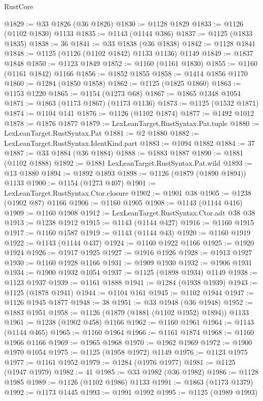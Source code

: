 \begin{lexlean}{RustCore}
\begin{coremodule}
@1829 := @33 @1826 (@36 @1826)
@1830 := @1128 @1829
@1833 := @1126 (@1102 @1830) @1133
@1835 := @1143 (@1144 @386)
@1837 := @1125 (@1833 @1835)
@1838 := 36
@1841 := @33 @1838 (@36 @1838)
@1842 := @1128 @1841
@1848 := @1125 (@1126 (@1102 @1842) @1133 @1136) @1149
@1849 := @1837 @1848
@1850 := @1123 @1849
@1852 := @1160 (@1161 @1830)
@1855 := @1160 (@1161 @1842) @1166
@1856 := @1852 @1855
@1858 := @1414 @1856 @1170
@1860 := @1284 (@1850 @1858)
@1862 := @1125 (@1825 @1860)
@1863 := @1153 @1220
@1865 := @1154 (@1273 @68)
@1867 := @1865 @1348 @1054
@1871 := @1863 (@1173 @1867) (@1173 @1136)
@1873 := @1125 (@1532 @1871)
@1874 := @1104 @141
@1876 := @1126 (@1102 @1874)
@1877 := @1492 @1012
@1878 := @1876 @1877
@1879 := LexLeanTarget.RustSyntax.Pat.tuple
@1880 := LexLeanTarget.RustSyntax.Pat
@1881 := @2 @1880
@1882 := LexLeanTarget.RustSyntax.IdentKind.part
@1883 := @1094 @1882
@1884 := 37
@1887 := @33 @1884 (@36 @1884)
@1888 := @1883 @1887
@1890 := @1881 (@1102 @1888)
@1892 := @1881 LexLeanTarget.RustSyntax.Pat.wild
@1893 := @13 @1880
@1894 := @1892 @1893
@1898 := @1126 (@1879 (@1890 @1894)) @1133
@1900 := @1154 (@1273 @407)
@1901 := LexLeanTarget.RustSyntax.Ctor.closure
@1902 := @1901 @38
@1905 := @1238 (@1902 @87) @1166
@1906 := @1160 @1905
@1908 := @1143 (@1144 @416)
@1909 := @1160 @1908
@1912 := LexLeanTarget.RustSyntax.Ctor.adt @38 @38
@1913 := @1238 @1912
@1915 := @1143 (@1144 @427)
@1916 := @1160 @1915
@1917 := @1160 @1587
@1919 := @1143 (@1144 @43)
@1920 := @1160 @1919
@1922 := @1143 (@1144 @437)
@1924 := @1160 @1922 @1166
@1925 := @1920 @1924
@1926 := @1917 @1925
@1927 := @1916 @1926
@1928 := @1913 @1927
@1930 := @1160 @1928 @1166
@1931 := @1909 @1930
@1932 := @1906 @1931
@1934 := @1900 @1932 @1054
@1937 := @1125 (@1898 @1934) @1149
@1938 := @1123 @1937
@1939 := @1161 @1888
@1941 := @1284 (@1938 @1939)
@1943 := @1125 (@1878 @1941)
@1944 := @1104 @161
@1945 := @1102 @1944
@1947 := @1126 @1945 @1877
@1948 := 38
@1951 := @33 @1948 (@36 @1948)
@1952 := @1883 @1951
@1958 := @1126 (@1879 (@1881 (@1102 @1952) @1894)) @1133
@1961 := @1238 (@1902 @458) @1166
@1962 := @1160 @1961
@1964 := @1143 (@1144 @465)
@1965 := @1160 @1964
@1966 := @1161 @1874
@1968 := @1160 @1966 @1166
@1969 := @1965 @1968
@1970 := @1962 @1969
@1972 := @1900 @1970 @1054
@1975 := @1125 (@1958 @1972) @1149
@1976 := @1123 @1975
@1977 := @1161 @1952
@1979 := @1284 (@1976 @1977)
@1981 := @1125 (@1947 @1979)
@1982 := 41
@1985 := @33 @1982 (@36 @1982)
@1986 := @1128 @1985
@1989 := @1126 (@1102 @1986) @1133
@1991 := @1863 (@1173 @1379)
@1992 := @1173 @1445
@1993 := @1991 @1992
@1995 := @1125 (@1989 @1993)

\end{coremodule}
\end{lexlean}
